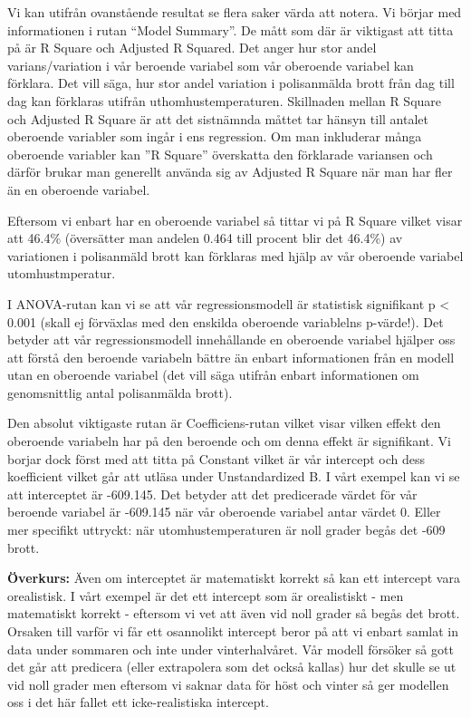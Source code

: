 \documentclass[
]{book}
\begin{document}
Vi kan utifrån ovanstående resultat se flera saker värda att notera. Vi börjar med informationen i rutan ``Model Summary''. De mått som där är viktigast att titta på är R Square och Adjusted R Squared. Det anger hur stor andel varians/variation i vår beroende variabel som vår oberoende variabel kan förklara. Det vill säga, hur stor andel variation i polisanmälda brott från dag till dag kan förklaras utifrån uthomhustemperaturen. Skillnaden mellan R Square och Adjusted R Square är att det sistnämnda måttet tar hänsyn till antalet oberoende variabler som ingår i ens regression. Om man inkluderar många oberoende variabler kan ''R Square'' överskatta den förklarade variansen och därför brukar man generellt använda sig av Adjusted R Square när man har fler än en oberoende variabel.

Eftersom vi enbart har en oberoende variabel så tittar vi på R Square vilket visar att 46.4\% (översätter man andelen 0.464 till procent blir det 46.4\%) av variationen i polisanmäld brott kan förklaras med hjälp av vår oberoende variabel utomhustmperatur.

I ANOVA-rutan kan vi se att vår regressionsmodell är statistisk signifikant p \textless{} 0.001 (skall ej förväxlas med den enskilda oberoende variablelns p-värde!). Det betyder att vår regressionsmodell innehållande en oberoende variabel hjälper oss att förstå den beroende variabeln bättre än enbart informationen från en modell utan en oberoende variabel (det vill säga utifrån enbart informationen om genomsnittlig antal polisanmälda brott).

Den absolut viktigaste rutan är Coefficiens-rutan vilket visar vilken effekt den oberoende variabeln har på den beroende och om denna effekt är signifikant. Vi borjar dock först med att titta på Constant vilket är vår intercept och dess koefficient vilket går att utläsa under Unstandardized B. I vårt exempel kan vi se att interceptet är -609.145. Det betyder att det predicerade värdet för vår beroende variabel är -609.145 när vår oberoende variabel antar värdet 0. Eller mer specifikt uttryckt: när utomhustemperaturen är noll grader begås det -609 brott.

\textbf{Överkurs:}
Även om interceptet är matematiskt korrekt så kan ett intercept vara orealistisk. I vårt exempel är det ett intercept som är orealistiskt - men matematiskt korrekt - eftersom vi vet att även vid noll grader så begås det brott. Orsaken till varför vi får ett osannolikt intercept beror på att vi enbart samlat in data under sommaren och inte under vinterhalvåret. Vår modell försöker så gott det går att predicera (eller extrapolera som det också kallas) hur det skulle se ut vid noll grader men eftersom vi saknar data för höst och vinter så ger modellen oss i det här fallet ett icke-realistiska intercept.
\end{document}
